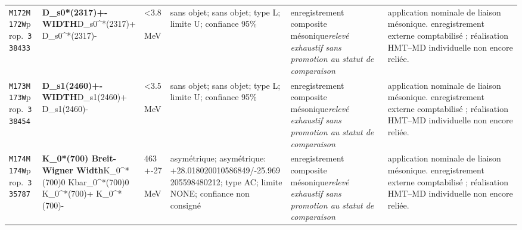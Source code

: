 \begin{landscape}
\begin{longtable}{L{1.85cm}L{4.45cm}L{2.35cm}L{4.05cm}L{3.35cm}L{7.15cm}}
\texttt{M172}\newline \texttt{M172W}\newline prop.\ \texttt{338433} & \textbf{D\_\allowbreak{}s0*(2317)+- WIDTH}\newline D\_\allowbreak{}s0\textasciicircum{}*(2317)+ \textbar{}\allowbreak{} D\_\allowbreak{}s0\textasciicircum{}*(2317)- & \textless{}3.8\,MeV & sans objet; sans objet; type L; limite U; confiance 95\% & enregistrement composite mésonique\newline \emph{relevé exhaustif sans promotion au statut de comparaison} & application nominale de liaison mésonique. enregistrement externe comptabilisé ; réalisation HMT--MD individuelle non encore reliée. \\
\texttt{M173}\newline \texttt{M173W}\newline prop.\ \texttt{338454} & \textbf{D\_\allowbreak{}s1(2460)+- WIDTH}\newline D\_\allowbreak{}s1(2460)+ \textbar{}\allowbreak{} D\_\allowbreak{}s1(2460)- & \textless{}3.5\,MeV & sans objet; sans objet; type L; limite U; confiance 95\% & enregistrement composite mésonique\newline \emph{relevé exhaustif sans promotion au statut de comparaison} & application nominale de liaison mésonique. enregistrement externe comptabilisé ; réalisation HMT--MD individuelle non encore reliée. \\
\texttt{M174}\newline \texttt{M174W}\newline prop.\ \texttt{335787} & \textbf{K\_\allowbreak{}0*(700) Breit-Wigner Width}\newline K\_\allowbreak{}0\textasciicircum{}*(700)0 \textbar{}\allowbreak{} Kbar\_\allowbreak{}0\textasciicircum{}*(700)0 \textbar{}\allowbreak{} K\_\allowbreak{}0\textasciicircum{}*(700)+ \textbar{}\allowbreak{} K\_\allowbreak{}0\textasciicircum{}*(700)- & 463+-27\,MeV & asymétrique; asymétrique: +28.018020010586849/-25.969205598480212; type AC; limite NONE; confiance non consigné & enregistrement composite mésonique\newline \emph{relevé exhaustif sans promotion au statut de comparaison} & application nominale de liaison mésonique. enregistrement externe comptabilisé ; réalisation HMT--MD individuelle non encore reliée. \\

\end{longtable}
\end{landscape}
